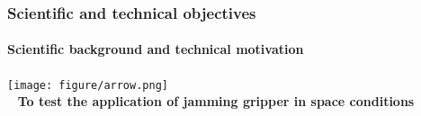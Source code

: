 \documentclass[xcolor=dvipsnames]{beamer}%
\begin{document}
\begin{frame} %
\frametitle{Scientific and technical objectives}
\framesubtitle{Scientific background and technical motivation} %
\centering
\texttt{[image: figure/arrow.png]}\\
\centering  \textbf{ To test the application of jamming gripper in space conditions} \\





\end{frame}
\end{document}
